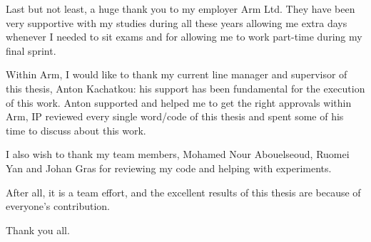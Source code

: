 \medskip

Last but not least, a huge thank you to my employer Arm Ltd. They have been
very supportive with my studies during all these years allowing me extra days
whenever I needed to sit exams and for allowing me to work part-time during my
final sprint.

Within Arm, I would like to thank my current line manager and supervisor of
this thesis, Anton Kachatkou: his support has been fundamental for the
execution of this work. Anton supported and helped me to get the right
approvals within Arm, IP reviewed every single word/code of this thesis and
spent some of his time to discuss about this work.

I also wish to thank my team members, Mohamed Nour Abouelseoud, Ruomei Yan and
Johan Gras for reviewing my code and helping with experiments.

After all, it is a team effort, and the excellent results of this thesis are
because of everyone's contribution.

\medskip

Thank you all.

\clearpage
